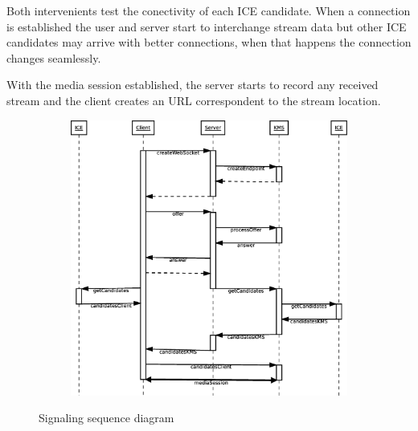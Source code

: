 Both intervenients test the conectivity of each \ac{ICE} candidate. When a connection is established the user and server start to interchange stream data but other \ac{ICE} candidates may arrive with better connections, when that happens the connection changes seamlessly. 

With the media session established, the server starts to record any received stream and the client creates an \ac{URL} correspondent to the stream location.

\begin{figure}[H]
    \centering
    \begin{subfigure}{}
    	\includegraphics[width=1.0\textwidth]{figures/signaling}
    \end{subfigure}
    \caption{Signaling sequence diagram}
\end{figure} 
